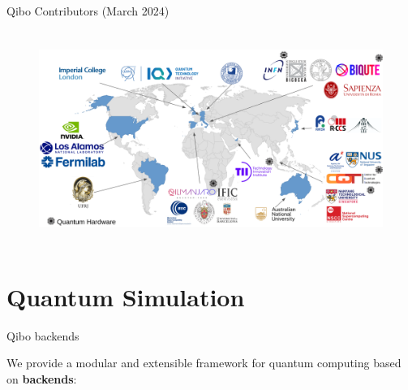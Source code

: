 \documentclass[aspectratio=169, 10pt, xcolor={svgnames}, hyperref={linkcolor=black}]{beamer}
\begin{document}
 \begin{frame}{Qibo Contributors (March 2024)}
   \begin{figure}
       \includegraphics[height=7cm]{figures/qibocoll.png}
   \end{figure}
 \end{frame}

\section{Quantum Simulation}

\begin{frame}{Qibo backends}

  We provide a modular and extensible framework for quantum computing based on \textbf{backends}:
  \vspace{-0.5cm}
  \begin{figure}
  \end{figure}

\end{frame}
\end{document}
